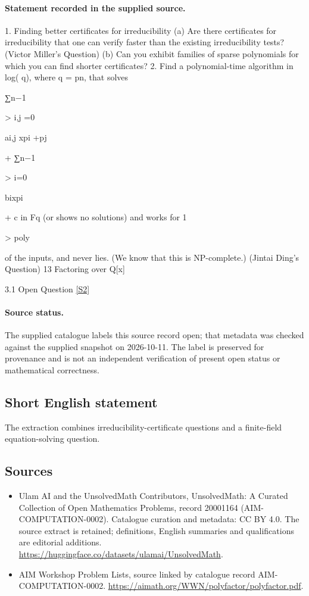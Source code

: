 \documentclass[11pt]{article}
\newcommand{\sref}[2]{\hyperlink{source:#1:#2}{[S#2]}}
\begin{document}
\paragraph{Statement recorded in the supplied source.}
1. Finding better certificates for irreducibility (a) Are there certificates for irreducibility that one can verify faster than the existing irreducibility tests? (Victor Miller's Question) (b) Can you exhibit families of sparse polynomials for which you can find shorter certificates? 2. Find a polynomial-time algorithm in log( q), where q = pn, that solves

∑n−1

> i,j =0

ai,j xpi +pj

+ ∑n−1

> i=0

bixpi

+ c in Fq (or shows no solutions) and works for 1

> poly

of the inputs, and never lies. (We know that this is NP-complete.) (Jintai Ding's Question) 13 Factoring over Q[x]

3.1 Open
Question \sref{20001164}{2}
\paragraph{Source status.}
The supplied catalogue labels this source record open; that metadata was checked against the supplied snapshot on 2026-10-11. The label is preserved for provenance and is not an independent verification of present open status or mathematical correctness.
\subsection{Short English statement}
The extraction combines irreducibility-certificate questions and a finite-field equation-solving question.
\subsection{Sources}
\begin{itemize}
\item[\hypertarget{source:20001164:1}{S1}] Ulam AI and the UnsolvedMath Contributors, UnsolvedMath: A Curated Collection of Open Mathematics Problems, record 20001164 (AIM-COMPUTATION-0002). Catalogue curation and metadata: CC BY 4.0. The source extract is retained; definitions, English summaries and qualifications are editorial additions.
\url{https://huggingface.co/datasets/ulamai/UnsolvedMath}.
\item[\hypertarget{source:20001164:2}{S2}] AIM Workshop Problem Lists, source linked by catalogue record AIM-COMPUTATION-0002.
\url{https://aimath.org/WWN/polyfactor/polyfactor.pdf}.
\end{itemize}
\end{document}
